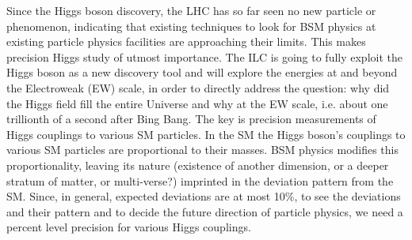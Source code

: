 Since the Higgs boson discovery, the LHC has so far seen no new particle or phenomenon, indicating that existing techniques to look for BSM physics at existing particle physics facilities are approaching their limits. This makes precision Higgs study of utmost importance. The ILC is going to fully exploit the Higgs boson as a new discovery tool and will explore the energies at and beyond the Electroweak (EW) scale, in order to directly address the question: why did the Higgs field fill the entire Universe and why at the EW scale, i.e. about one trillionth of a second after Bing Bang. 
The key is precision measurements of Higgs couplings to various SM particles. In the SM the Higgs boson's couplings to various SM particles are proportional to their masses. BSM physics modifies this proportionality, leaving its nature (existence of another dimension, or a deeper stratum of matter, or multi-verse?) imprinted in the deviation pattern from the SM. 
Since, in general, expected deviations are at most 10\%, to see the deviations and their pattern and to decide the future direction of particle physics, we need a percent level precision for various Higgs couplings.\\

